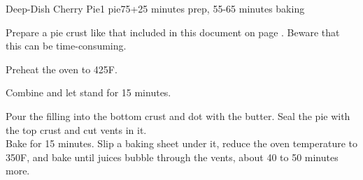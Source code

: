 \documentclass[../Cookbook.tex]{subfiles}
\begin{document}
\begin{recipe}{Deep-Dish Cherry Pie}{1 pie}{75+25 minutes prep, 55-65 minutes baking}

	Prepare a pie crust like that included in this document on page \pageref{PieCrust}. Beware that this can be time-consuming.

	\newstep
	Preheat the oven to 425\0F.

	Combine and let stand for 15 minutes.

	Pour the filling into the bottom crust and dot with the butter. Seal the pie with the top crust and cut vents in it.\\
	Bake for 15 minutes. Slip a baking sheet under it, reduce the oven temperature to 350\0F, and bake until juices bubble through the vents, about 40 to 50 minutes more.

\end{recipe}
\end{document}
